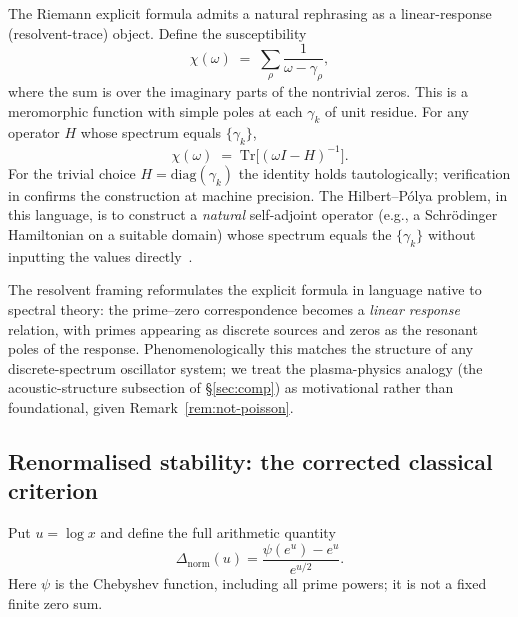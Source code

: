 \documentclass[11pt,a4paper]{article}
\theoremstyle{plain}
\theoremstyle{definition}
\theoremstyle{remark}
\begin{document}
The Riemann explicit formula admits a natural rephrasing as a
linear-response (resolvent-trace) object.  Define the susceptibility
\begin{equation}\label{eq:chi-omega}
  \chi(\omega) \;=\; \sum_{\rho} \frac{1}{\omega - \gamma_\rho},
\end{equation}
where the sum is over the imaginary parts of the nontrivial zeros.
This is a meromorphic function with simple poles at each $\gamma_k$
of unit residue.  For any operator $H$ whose spectrum equals
$\{\gamma_k\}$,
\begin{equation}\label{eq:trace-resolvent}
  \chi(\omega) \;=\; \mathrm{Tr}\bigl[(\omega I - H)^{-1}\bigr].
\end{equation}
For the trivial choice $H = \mathrm{diag}(\gamma_k)$ the identity
holds tautologically; verification in
 confirms
the construction at machine precision.  The Hilbert--P\'{o}lya
problem, in this language, is to construct a \emph{natural}
self-adjoint operator (e.g., a Schr\"{o}dinger Hamiltonian on a
suitable domain) whose spectrum equals the $\{\gamma_k\}$ without
inputting the values directly~\cite{BerryKeating1999, Connes1999}.

The resolvent framing reformulates the explicit formula in
language native to spectral theory: the prime--zero
correspondence becomes a \emph{linear response} relation, with primes
appearing as discrete sources and zeros as the resonant poles of the
response.  Phenomenologically this matches the structure of any
discrete-spectrum oscillator system; we treat the plasma-physics
analogy (the acoustic-structure subsection of \S\ref{sec:comp}) as
motivational rather than foundational, given Remark~\ref{rem:not-poisson}.

\subsection{Renormalised stability: the corrected classical criterion}
\label{sec:vonKoch}
Put $u=\log x$ and define the full arithmetic quantity
\begin{equation}\label{eq:Delta-norm}
 \Delta_{\mathrm{norm}}(u)=\frac{\psi(e^u)-e^u}{e^{u/2}}.
\end{equation}
Here $\psi$ is the Chebyshev function, including all prime powers; it is not
a fixed finite zero sum.
\end{document}
